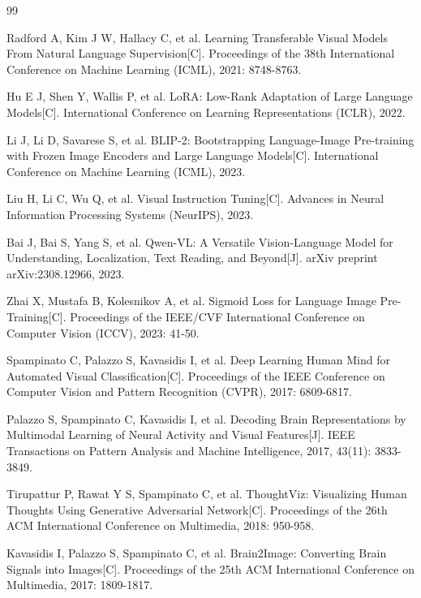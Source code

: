 \begin{thebibliography}{99}

 Radford A, Kim J W, Hallacy C, et al. Learning Transferable Visual Models From Natural Language Supervision[C]. Proceedings of the 38th International Conference on Machine Learning (ICML), 2021: 8748-8763.

 Hu E J, Shen Y, Wallis P, et al. LoRA: Low-Rank Adaptation of Large Language Models[C]. International Conference on Learning Representations (ICLR), 2022.

 Li J, Li D, Savarese S, et al. BLIP-2: Bootstrapping Language-Image Pre-training with Frozen Image Encoders and Large Language Models[C]. International Conference on Machine Learning (ICML), 2023.

 Liu H, Li C, Wu Q, et al. Visual Instruction Tuning[C]. Advances in Neural Information Processing Systems (NeurIPS), 2023.

 Bai J, Bai S, Yang S, et al. Qwen-VL: A Versatile Vision-Language Model for Understanding, Localization, Text Reading, and Beyond[J]. arXiv preprint arXiv:2308.12966, 2023.

 Zhai X, Mustafa B, Kolesnikov A, et al. Sigmoid Loss for Language Image Pre-Training[C]. Proceedings of the IEEE/CVF International Conference on Computer Vision (ICCV), 2023: 41-50.

 Spampinato C, Palazzo S, Kavasidis I, et al. Deep Learning Human Mind for Automated Visual Classification[C]. Proceedings of the IEEE Conference on Computer Vision and Pattern Recognition (CVPR), 2017: 6809-6817.

 Palazzo S, Spampinato C, Kavasidis I, et al. Decoding Brain Representations by Multimodal Learning of Neural Activity and Visual Features[J]. IEEE Transactions on Pattern Analysis and Machine Intelligence, 2017, 43(11): 3833-3849.

 Tirupattur P, Rawat Y S, Spampinato C, et al. ThoughtViz: Visualizing Human Thoughts Using Generative Adversarial Network[C]. Proceedings of the 26th ACM International Conference on Multimedia, 2018: 950-958.

 Kavasidis I, Palazzo S, Spampinato C, et al. Brain2Image: Converting Brain Signals into Images[C]. Proceedings of the 25th ACM International Conference on Multimedia, 2017: 1809-1817.


\end{thebibliography}

